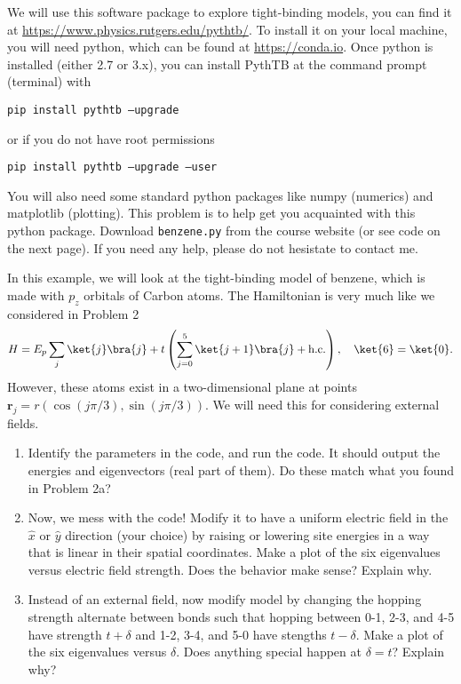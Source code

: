 \documentclass{jhwhw}
\begin{document}
We will use this software package to explore tight-binding models, you can find it at \url{https://www.physics.rutgers.edu/pythtb/}.
To install it on your local machine, you will need python, which can be found at \url{https://conda.io}. Once python is installed (either 2.7 or 3.x), you can install PythTB at the command prompt (terminal) with

\vspace{10pt}
{\tt pip install pythtb --upgrade}
\vspace{10pt}

or if you do not have root permissions

\vspace{10pt}
{\tt pip install pythtb --upgrade --user}
\vspace{10pt}

You will also need some standard python packages like {\sc numpy} (numerics) and {\sc matplotlib} (plotting).
This problem is to help get you acquainted with this python package. Download \texttt{benzene.py} from the course website (or see code on the next page).
If you need any help, please do not hesistate to contact me.

In this example, we will look at the tight-binding model of benzene, which is made with $p_{z}$ orbitals of Carbon atoms. The Hamiltonian is very much like we considered in Problem 2
\begin{equation}
  \label{eq:9}
  H = E_{p} \sum_{j} \ket{j}\bra{j} + t \left(\sum_{j=0}^{5} \ket{j+1} \bra{j} + \mathrm{h.c.}\right), \quad \ket{6} = \ket{0}.
\end{equation}
However, these atoms exist in a two-dimensional plane at points $\mathbf r_{j} = r (\cos(j \pi/3), \sin(j \pi/3)) $. We will need this for considering external fields.

\begin{enumerate}
  \item Identify the parameters in the code, and run the code. It should output the energies and eigenvectors (real part of them). Do these match what you found in Problem 2a?
  \item Now, we mess with the code! Modify it to have a uniform electric field in the $\hat x$ or $\hat y$ direction (your choice) by raising or lowering site energies in a way that is linear in their spatial coordinates. Make a plot of the six eigenvalues versus electric field strength. Does the behavior make sense? Explain why.
  \item Instead of an external field, now modify model by changing the hopping strength alternate between bonds such that hopping between 0-1, 2-3, and 4-5 have strength $t+\delta$ and 1-2, 3-4, and 5-0 have stengths $t-\delta$. Make a plot of the six eigenvalues versus $\delta$. Does anything special happen at $\delta=t$? Explain why?
\end{enumerate}
\end{document}
